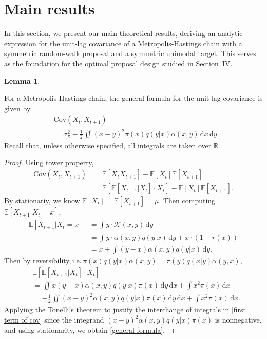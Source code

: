 \documentclass[conference]{IEEEtran}
\newcommand{\df}{\mathrm{d}}
\theoremstyle{definition}
\newtheorem{lemma}[theorem]{Lemma}
\begin{document}
\section{Main results}
In this section, we present our main theoretical results, deriving an analytic expression for the unit-lag covariance of a Metropolis-Hastings chain with a symmetric random-walk proposal and a symmetric unimodal target. This serves as the foundation for the optimal proposal design studied in Section~IV.
\begin{lemma}\label{covariance formula}
    
For a Metropolis-Hastings chain, the general formula for the unit-lag covariance is given by
\begin{align}\label{general formula}
        &\mathrm{Cov}(X_t,X_{t+1})\nonumber\\
        &=\sigma_{\pi}^2-\tfrac12\iint(x-y)^2\pi(x)q(y|x)\alpha(x,y)\,\df x\,\df y.
\end{align}
Recall that, unless otherwise specified, all integrals are taken over $\mathbb{R}$.
\end{lemma}
\begin{proof} Using tower property,
\begin{align*}
    \mathrm{Cov}(X_t,X_{t+1})&=\mathbb{E}[X_tX_{t+1}]-\mathbb{E}[X_t]\mathbb{E}[X_{t+1}]\\
    &=\mathbb{E}[\mathbb{E}[X_{t+1}|X_t]\cdot X_{t}]-\mathbb{E}[X_t]\mathbb{E}[X_{t+1}].  
\end{align*}
By stationariy, we know \(\mathbb{E}[X_t]=\mathbb{E}[X_{t+1}]=\mu\). Then computing \(\mathbb{E}[X_{t+1}|X_t=x]\),
\begin{align*}
\mathbb{E}[X_{t+1}|X_t=x]&=\int y\cdot\mathcal{K}(x,y)\,\df y\\
&=\int y\cdot\alpha(x,y)q(y|x)\,\df y+x\cdot(1-r(x))\\
&=x+\int(y-x)\alpha(x,y)q(y|x)\,\df y.
\end{align*}
Then by reversibility,\,i.e.\,\(\pi(x)q(y|x)\alpha(x,y)=\pi(y)q(x|y)\alpha(y,x)\),
\begin{align}\label{first term of cov}
    &\mathbb{E}[\mathbb{E}[X_{t+1}|X_t]\cdot X_{t}]\nonumber\\
    &=\iint x(y-x)\alpha(x,y)q(y|x)\pi(x)\,\df y\,\df x+\int x^2\pi(x)\,\df x\nonumber\\
    &=-\frac12\iint(x-y)^2\alpha(x,y)q(y|x)\pi(x)\,\df y\,\df x+\int x^2\pi(x)\,\df x.
\end{align}
Applying the Tonelli's theorem \cite{Tonelli} to justify the interchange of integrals in \eqref{first term of cov} since the integrand \((x-y)^2\alpha(x,y)q(y|x)\pi(x)\) is nonnegative, and using stationarity, we obtain \eqref{general formula}.
\end{proof}
\end{document}
